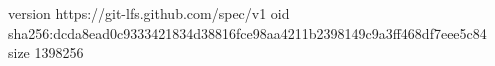 version https://git-lfs.github.com/spec/v1
oid sha256:dcda8ead0c9333421834d38816fce98aa4211b2398149c9a3ff468df7eee5c84
size 1398256
